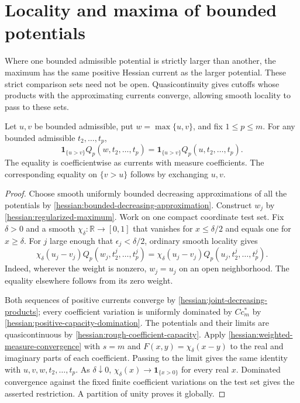 \section{Locality and maxima of bounded potentials}
\label{sec:hessian-bounded-locality}

Where one bounded admissible potential is strictly larger than another,
the maximum has the same positive Hessian current as the larger
potential. These strict comparison sets need not be open.
Quasicontinuity gives cutoffs whose products with the approximating
currents converge, allowing smooth locality to pass to these sets.

\begin{proposition}\label{hessian:bounded-strict-locality}
Let $u,v$ be bounded admissible, put $w=\max\{u,v\}$, and fix
$1\leq p\leq m$. For any bounded admissible $t_2,\ldots,t_p$,
\[
 \mathbf1_{\{u>v\}}Q_p(w,t_2,\ldots,t_p)
       =\mathbf1_{\{u>v\}}Q_p(u,t_2,\ldots,t_p).
\]
The equality is coefficientwise as currents with measure
coefficients. The corresponding equality on $\{v>u\}$ follows
by exchanging $u,v$.
\end{proposition}
\begin{proof}
Choose smooth uniformly bounded decreasing approximations of all
the potentials by \cref{hessian:bounded-decreasing-approximation}.
Construct $w_j$ by \cref{hessian:regularized-maximum}. Work on
one compact coordinate test set. Fix $\delta>0$ and a smooth
$\chi_\delta\colon\mathbb R\to[0,1]$ that vanishes for
$x\leq\delta/2$ and equals one for $x\geq\delta$.
For $j$ large enough that $\epsilon_j<\delta/2$, ordinary smooth
locality gives
\[
 \chi_\delta(u_j-v_j)Q_p(w_j,t_2^j,\ldots,t_p^j)
       =\chi_\delta(u_j-v_j)Q_p(u_j,t_2^j,\ldots,t_p^j).
\]
Indeed, wherever the weight is nonzero, $w_j=u_j$ on an open
neighborhood. The equality elsewhere follows from its zero weight.

Both sequences of positive currents converge by
\cref{hessian:joint-decreasing-products}; every coefficient variation
is uniformly dominated by $C c_m^*$ by
\cref{hessian:positive-capacity-domination}. The potentials and their
limits are quasicontinuous by \cref{hessian:rough-coefficient-capacity}.
Apply \cref{hessian:weighted-measure-convergence} with $s=m$ and
$F(x,y)=\chi_\delta(x-y)$ to the real and imaginary parts of
each coefficient. Passing to the limit gives the same identity
with $u,v,w,t_2,\ldots,t_p$.
As $\delta\downarrow0$, $\chi_\delta(x)\to\mathbf1_{\{x>0\}}$
for every real $x$. Dominated convergence against
the fixed finite coefficient variations on the test set gives
the asserted restriction. A partition of unity proves it globally.
\end{proof}


